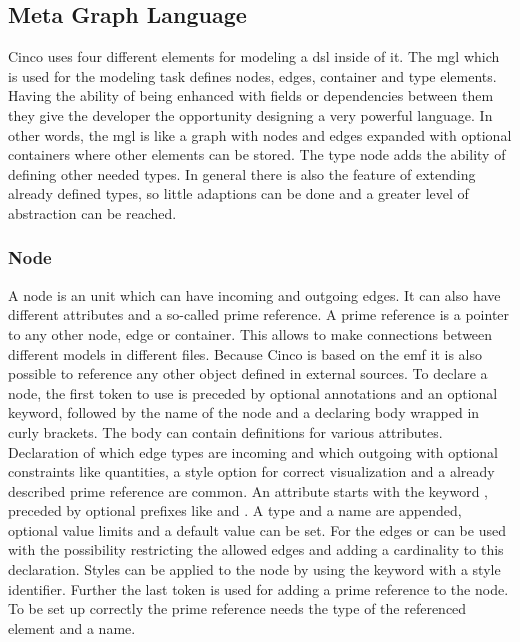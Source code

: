 \subsection{Meta Graph Language}

Cinco uses four different elements for modeling a \gls{dsl} inside of it. The \gls{mgl} which is used for the modeling task defines nodes, edges, container and type elements. Having the ability of being enhanced with fields or dependencies between them they give the developer the opportunity designing a very powerful language. In other words, the \gls{mgl} is like a graph with nodes and edges expanded with optional containers where other elements can be stored. The type node adds the ability of defining other needed types. In general there is also the feature of extending already defined types, so little adaptions can be done and a greater level of abstraction can be reached.

\subsubsection{Node}

A node is an unit which can have incoming and outgoing edges. It can also have different attributes and a so-called prime reference. A prime reference is a pointer to any other node, edge or container. This allows to make connections between different models in different files. Because Cinco is based on the \gls{emf} it is also possible to reference any other object defined in external sources. To declare a node, the first token to use is  preceded by optional annotations and an optional  keyword, followed by the name of the node and a declaring body wrapped in curly brackets. The body can contain definitions for various attributes. Declaration of which edge types are incoming and which outgoing with optional constraints like quantities, a style option for correct visualization and a already described prime reference are common. An attribute starts with the keyword , preceded by optional prefixes like  and . A type and a name are appended, optional value limits and a default value can be set. For the edges  or  can be used with the possibility restricting the allowed edges and adding a cardinality to this declaration. Styles can be applied to the node by using the  keyword with a style identifier.
Further the last token  is used for adding a prime reference to the node. To be set up correctly the prime reference needs the type of the referenced element and a name.

